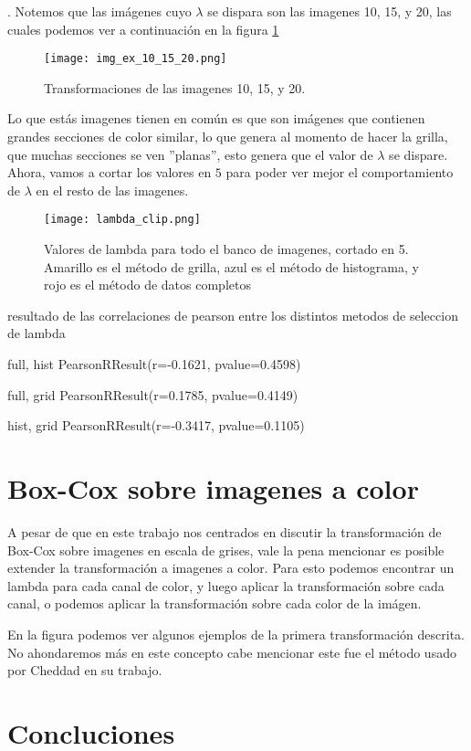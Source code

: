     . Notemos que las im\'agenes cuyo $\lambda$ se dispara son las imagenes 10, 15, y 20, las cuales podemos ver a continuaci\'on en la figura \ref{fig:img_bci_10_15_20}

    \begin{figure}[H]
        \centering
        \texttt{[image: img\_ex\_10\_15\_20.png]}
        \caption{Transformaciones de las imagenes 10, 15, y 20.}
        \label{fig:img_bci_10_15_20}
    \end{figure}

    Lo que est\'as imagenes tienen en com\'un es que son im\'agenes que contienen grandes secciones de color similar, lo que genera al momento de hacer la grilla, que muchas secciones se ven ''planas'', esto genera que el valor de $\lambda$ se dispare. Ahora, vamos a cortar los valores en $5$ para poder ver mejor el comportamiento de $\lambda$ en el resto de las imagenes.

    \begin{figure}[H]
        \texttt{[image: lambda\_clip.png]}
        \caption{Valores de lambda para todo el banco de imagenes, cortado en 5. Amarillo es el m\'etodo de grilla, azul es el m\'etodo de histograma, y rojo es el m\'etodo de datos completos}
        \label{fig:lambda_clip}
    \end{figure}



   resultado de las correlaciones de pearson entre los distintos metodos de seleccion de lambda

    full, hist PearsonRResult(r=-0.1621, pvalue=0.4598)

    full, grid PearsonRResult(r=0.1785, pvalue=0.4149)

    hist, grid PearsonRResult(r=-0.3417, pvalue=0.1105)


    \section{Box-Cox sobre imagenes a color}

    A pesar de que en este trabajo nos centrados en discutir la transformaci\'on de Box-Cox sobre imagenes en escala de grises, vale la pena mencionar es posible extender la transformaci\'on a imagenes a color. Para esto podemos encontrar un lambda para cada canal de color, y luego aplicar la transformaci\'on sobre cada canal, o podemos aplicar la transformaci\'on sobre cada color de la im\'agen. 


    En la figura podemos ver algunos ejemplos de la primera transformaci\'on descrita.  No ahondaremos m\'as en este concepto cabe mencionar este fue el m\'etodo usado por Cheddad \cite{boxcoximg} en su trabajo.

    \section{Concluciones}